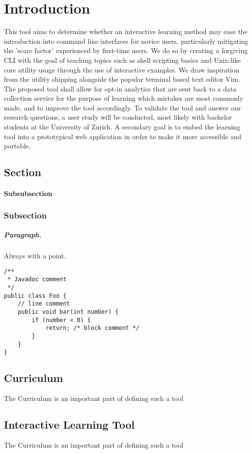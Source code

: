 \chapter{Introduction}
This tool aims to determine whether an interactive learning method may ease the
introduction into command line interfaces for novice users, particularly
mitigating the 'scare factor' experienced by first-time users. We do so by
creating a forgiving CLI with the goal of teaching topics such as shell
scripting basics and Unix-like core utility usage through the use of
interactive examples. We draw inspiration from the
\cite{pierce_ware_smith_moolenaar_2019} utility shipping alongside the popular
terminal based text editor Vim. The proposed tool shall allow for opt-in
analytics that are sent back to a data collection service for the purpose of
learning which mistakes are most commonly made, and to improve the tool
accordingly. To validate the tool and answer our research questions, a user
study will be conducted, most likely with bachelor students at the University
of Zurich. A secondary goal is to embed the learning tool into a prototypical
web application in order to make it more accessible and portable.
\section{Section}
%
\subsubsection{Subsubsection}

\subsection{Subsection}
%


\paragraph{Paragraph.} Always with a point.

\begin{lstlisting}[caption=An example code snippet]
/**
 * Javadoc comment
 */
public class Foo {
	// line comment
	public void bar(int number) {
		if (number < 0) {
			return; /* block comment */
		}
	}
}
\end{lstlisting}


\section{Curriculum}

The Curriculum is an important part of defining such a tool 

\section{Interactive Learning Tool}

The Curriculum is an important part of defining such a tool 


